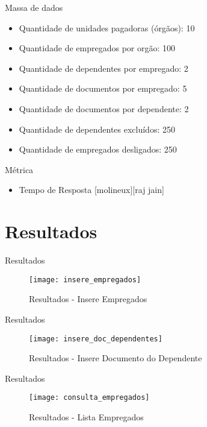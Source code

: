 \begin{frame}{Massa de dados}
\begin{itemize}
\item Quantidade de unidades pagadoras (órgãos): 10
\item Quantidade de empregados por orgão: 100
\item Quantidade de dependentes por empregado: 2 
\item Quantidade de documentos por empregado: 5
\item Quantidade de documentos por dependente: 2
\item Quantidade de dependentes excluídos: 250
\item Quantidade de empregados desligados: 250
\end{itemize}
\end{frame}

\begin{frame}{Métrica}
\begin{itemize}
\item Tempo de Resposta [molineux][raj jain]
\end{itemize}
\end{frame}

\section{Resultados}

\begin{frame}{Resultados}
\begin{figure}[!htbp]
	\begin{center}
		\texttt{[image: insere\_empregados]}
	\end{center}
	\caption{Resultados - Insere Empregados}
	\label{fig:resultinsereempregados}
\end{figure}
\end{frame}

\begin{frame}{Resultados}
\begin{figure}[!htbp]
	\begin{center}
		\texttt{[image: insere\_doc\_dependentes]}
	\end{center}
	\caption{Resultados - Insere Documento do Dependente}
	\label{fig:resultinseredocdependente}
\end{figure}
\end{frame}

\begin{frame}{Resultados}
\begin{figure}[!htbp]
	\begin{center}
		\texttt{[image: consulta\_empregados]}
	\end{center}
	\caption{Resultados - Lista Empregados}
	\label{fig:resultlistaempregados}
\end{figure}
\end{frame}

